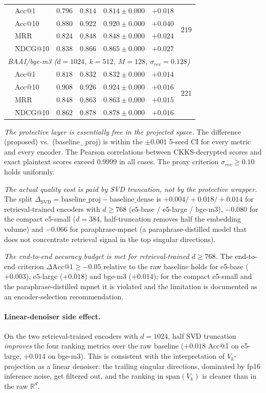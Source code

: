 \documentclass[11pt,a4paper]{article}
\begin{document}
\begin{table}[!t]
{\begin{tabular}{@{}llrrrrr@{}}
& Acc@1   & $0.796$ & $0.814$ & $0.814 \pm 0.000$ & $+0.018$ & \multirow{4}{*}{$219$} \\
& Acc@10  & $0.880$ & $0.922$ & $0.920 \pm 0.000$ & $+0.040$ & \\
& MRR     & $0.824$ & $0.848$ & $0.848 \pm 0.000$ & $+0.024$ & \\
& NDCG@10 & $0.838$ & $0.866$ & $0.865 \pm 0.000$ & $+0.027$ & \\ \midrule
\multicolumn{7}{l}{\emph{BAAI/bge-m3 ($d=1024$, $k=512$, $M=128$, $\sigma_{rec}=0.128$)}} \\
& Acc@1   & $0.818$ & $0.832$ & $0.832 \pm 0.000$ & $+0.014$ & \multirow{4}{*}{$221$} \\
& Acc@10  & $0.908$ & $0.926$ & $0.924 \pm 0.000$ & $+0.016$ & \\
& MRR     & $0.848$ & $0.863$ & $0.863 \pm 0.000$ & $+0.015$ & \\
& NDCG@10 & $0.862$ & $0.878$ & $0.878 \pm 0.000$ & $+0.016$ & \\
\bottomrule
\end{tabular}}
\end{table}

\emph{The protective layer is essentially free in the projected space.}
The difference (proposed) vs.\ (baseline\_proj) is within the $\pm 0.001$
5-seed CI for every metric and every encoder. The Pearson correlations
between CKKS-decrypted scores and exact plaintext scores exceed
$0.9999$ in all cases. The proxy criterion $\sigma_{rec} \geq 0.10$
holds uniformly.

\emph{The actual quality cost is paid by SVD truncation, not by the
protective wrapper.} The split
$\Delta_{\mathrm{SVD}} = \mathrm{baseline\_proj} - \mathrm{baseline\_dense}$
is $+0.004/+0.018/+0.014$ for retrieval-trained encoders with
$d \geq 768$ (e5-base / e5-large / bge-m3), $-0.080$ for the
compact e5-small ($d = 384$, half-truncation removes half the embedding
volume) and $-0.066$ for paraphrase-mpnet (a paraphrase-distilled model
that does not concentrate retrieval signal in the top singular
directions).

\emph{The end-to-end accuracy budget is met for retrieval-trained
$d \geq 768$.} The end-to-end criterion
$\Delta\mathrm{Acc@1} \geq -0.05$ relative to the raw baseline holds
for e5-base ($+0.003$), e5-large ($+0.018$) and bge-m3 ($+0.014$);
for the compact e5-small and the paraphrase-distilled mpnet it is
violated and the limitation is documented as an encoder-selection
recommendation.

\paragraph{Linear-denoiser side effect.} On the two
retrieval-trained encoders with $d = 1024$, half SVD truncation
\emph{improves} the four ranking metrics over the raw baseline
($+0.018$ Acc@1 on e5-large, $+0.014$ on bge-m3). This is consistent
with the interpretation of $V_k$-projection as a linear denoiser:
the trailing singular directions, dominated by fp16 inference noise,
get filtered out, and the ranking in $\mathrm{span}(V_k)$ is cleaner
than in the raw $\mathbb{R}^d$.
\end{document}
